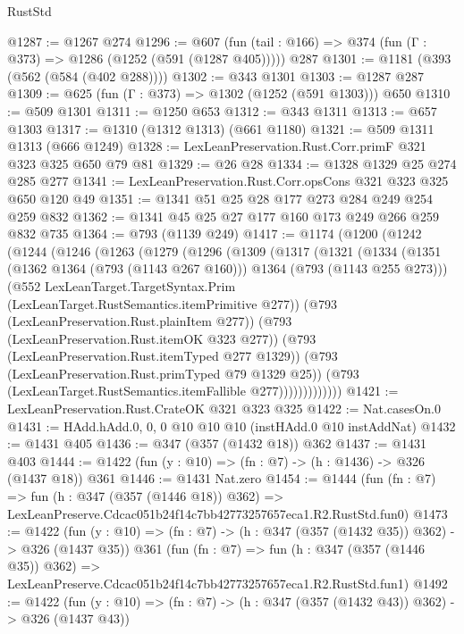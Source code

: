 \begin{lexlean}{RustStd}
\begin{coremodule}
@1287 := @1267 @274
@1296 := @607 (fun (tail : @166) => @374 (fun (Γ : @373) => @1286 (@1252 (@591 (@1287 @405))))) @287
@1301 := @1181 (@393 (@562 (@584 (@402 @288))))
@1302 := @343 @1301
@1303 := @1287 @287
@1309 := @625 (fun (Γ : @373) => @1302 (@1252 (@591 @1303))) @650
@1310 := @509 @1301
@1311 := @1250 @653
@1312 := @343 @1311
@1313 := @657 @1303
@1317 := @1310 (@1312 @1313) (@661 @1180)
@1321 := @509 @1311 @1313 (@666 @1249)
@1328 := LexLeanPreservation.Rust.Corr.primF @321 @323 @325 @650 @79 @81
@1329 := @26 @28
@1334 := @1328 @1329 @25 @274 @285 @277
@1341 := LexLeanPreservation.Rust.Corr.opsCons @321 @323 @325 @650 @120 @49
@1351 := @1341 @51 @25 @28 @177 @273 @284 @249 @254 @259 @832
@1362 := @1341 @45 @25 @27 @177 @160 @173 @249 @266 @259 @832 @735
@1364 := @793 (@1139 @249)
@1417 := @1174
    (@1200
      (@1242
        (@1244
          (@1246
            (@1263
              (@1279
                (@1296
                  (@1309
                    (@1317
                      (@1321
                        (@1334
                          (@1351
                            (@1362 @1364 (@793 (@1143 @267 @160)))
                            @1364
                            (@793 (@1143 @255 @273)))
                          (@552
                            LexLeanTarget.TargetSyntax.Prim
                            (LexLeanTarget.RustSemantics.itemPrimitive @277))
                          (@793 (LexLeanPreservation.Rust.plainItem @277))
                          (@793 (LexLeanPreservation.Rust.itemOK @323 @277))
                          (@793 (LexLeanPreservation.Rust.itemTyped @277 @1329))
                          (@793 (LexLeanPreservation.Rust.primTyped @79 @1329 @25))
                          (@793 (LexLeanTarget.RustSemantics.itemFallible @277)))))))))))))
@1421 := LexLeanPreservation.Rust.CrateOK @321 @323 @325
@1422 := Nat.casesOn.{0}
@1431 := HAdd.hAdd.{0, 0, 0} @10 @10 @10 (instHAdd.{0} @10 instAddNat)
@1432 := @1431 @405
@1436 := @347 (@357 (@1432 @18)) @362
@1437 := @1431 @403
@1444 := @1422 (fun (y : @10) => (fn : @7) -> (h : @1436) -> @326 (@1437 @18)) @361
@1446 := @1431 Nat.zero
@1454 := @1444
    (fun (fn : @7) =>
    fun (h : @347 (@357 (@1446 @18)) @362) =>
    LexLeanPreserve.Cdcac051b24f14c7bb42773257657eca1.R2.RustStd.fun0)
@1473 := @1422
    (fun (y : @10) => (fn : @7) -> (h : @347 (@357 (@1432 @35)) @362) -> @326 (@1437 @35))
    @361
    (fun (fn : @7) =>
    fun (h : @347 (@357 (@1446 @35)) @362) =>
    LexLeanPreserve.Cdcac051b24f14c7bb42773257657eca1.R2.RustStd.fun1)
@1492 := @1422
    (fun (y : @10) => (fn : @7) -> (h : @347 (@357 (@1432 @43)) @362) -> @326 (@1437 @43))

\end{coremodule}
\end{lexlean}
